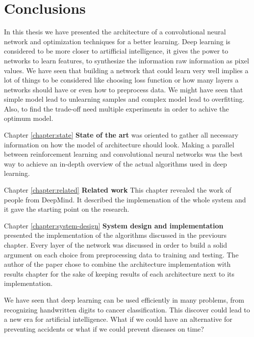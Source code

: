 \chapter{Conclusions}
\label{chapter:conclusions}

In this thesis we have presented the architecture of a convolutional neural network and optimization techniques for a better learning. Deep learning is considered to be more closer to artifficial intelligence, it gives the power to networks to learn features, to synthesize the information raw information as pixel values. We have seen that building a network that could learn very well implies a lot of things to be considered like choosing loss function or how many layers a networks should have or even how to preprocess data. We might have seen that simple model lead to unlearning samples and complex model lead to overfitting. Also, to find the trade-off need multiple experiments in order to achive the optimum model.

Chapter \ref{chapter:state} \textbf{State of the art} was oriented to gather all necessary information on how the model of architecture should look. Making a parallel between reinforcement learning and convolutional neural networks was the best way to achieve an in-depth overview of the actual algorithms used in deep learning.

Chapter \ref{chapter:related} \textbf{Related work} This chapter revealed the work of people from DeepMind. It described the implemenation of the whole system and it gave the starting point on the research.

Chapter \ref{chapter:system-design} \textbf{System design and implementation} presented the implementation of the algorithms discussed in the previours chapter. Every layer of the network was discussed in order to build a solid argument on each choice from preprocessing data to training and testing. The author of the paper chose to combine the architecture implementation with results chapter for the sake of keeping results of each architecture next to its implementation.

We have seen that deep learning can be used efficiently in many problems, from recognizing handwritten digits to cancer classification. This discover could lead to a new era for artificial intelligence. What if we could have an alternative for preventing accidents or what if we could prevent diseases on time?
